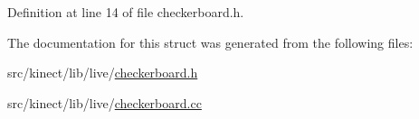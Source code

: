 Definition at line 14 of file checkerboard.\+h.



The documentation for this struct was generated from the following files\+:\begin{DoxyCompactItemize}
\item 
src/kinect/lib/live/\hyperlink{checkerboard_8h}{checkerboard.\+h}\item 
src/kinect/lib/live/\hyperlink{checkerboard_8cc}{checkerboard.\+cc}\end{DoxyCompactItemize}
